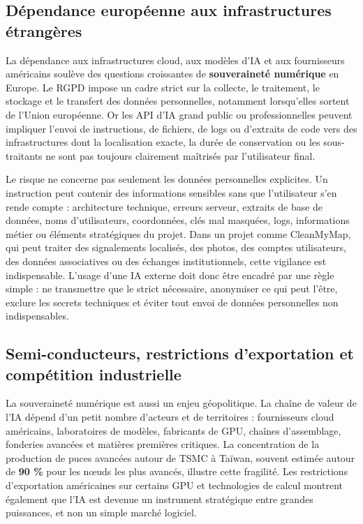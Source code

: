 \documentclass[
  10pt,
  a4paper,
  DIV=11,
  numbers=noendperiod,
  oneside]{scrreprt}
\let\oldtextbf\textbf
\renewcommand{\textbf}[1]{\oldtextbf{\textcolor{cmmnavy}{#1}}}
\begin{document}
\subsection{Dépendance européenne aux infrastructures
étrangères}\label{duxe9pendance-europuxe9enne-aux-infrastructures-uxe9tranguxe8res}

La dépendance aux infrastructures cloud, aux modèles d'IA et aux
fournisseurs américains soulève des questions croissantes de
\textbf{souveraineté numérique} en Europe. Le RGPD impose un cadre
strict sur la collecte, le traitement, le stockage et le transfert des
données personnelles, notamment lorsqu'elles sortent de l'Union
européenne. Or les API d'IA grand public ou professionnelles peuvent
impliquer l'envoi de instructions, de fichiers, de logs ou d'extraits de
code vers des infrastructures dont la localisation exacte, la durée de
conservation ou les sous-traitants ne sont pas toujours clairement
maîtrisés par l'utilisateur final.

Le risque ne concerne pas seulement les données personnelles explicites.
Un instruction peut contenir des informations sensibles sans que
l'utilisateur s'en rende compte : architecture technique, erreurs
serveur, extraits de base de données, noms d'utilisateurs, coordonnées,
clés mal masquées, logs, informations métier ou éléments stratégiques du
projet. Dans un projet comme CleanMyMap, qui peut traiter des
signalements localisés, des photos, des comptes utilisateurs, des
données associatives ou des échanges institutionnels, cette vigilance
est indispensable. L'usage d'une IA externe doit donc être encadré par
une règle simple : ne transmettre que le strict nécessaire, anonymiser
ce qui peut l'être, exclure les secrets techniques et éviter tout envoi
de données personnelles non indispensables.

\subsection{Semi-conducteurs, restrictions d'exportation et compétition
industrielle}\label{semi-conducteurs-restrictions-dexportation-et-compuxe9tition-industrielle}

La souveraineté numérique est aussi un enjeu géopolitique. La chaîne de
valeur de l'IA dépend d'un petit nombre d'acteurs et de territoires :
fournisseurs cloud américains, laboratoires de modèles, fabricants de
GPU, chaînes d'assemblage, fonderies avancées et matières premières
critiques. La concentration de la production de puces avancées autour de
TSMC à Taïwan, souvent estimée autour de \textbf{90 \%} pour les nœuds
les plus avancés, illustre cette fragilité. Les restrictions
d'exportation américaines sur certains GPU et technologies de calcul
montrent également que l'IA est devenue un instrument stratégique entre
grandes puissances, et non un simple marché logiciel.
\end{document}
